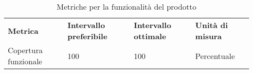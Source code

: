 \renewcommand{\arraystretch}{2.2}
\begin{longtable}{|C{4.5cm}|C{2.25cm}|C{2.25cm}|C{3cm}|}

	\caption{Metriche per la funzionalità del prodotto}\\
	\hline

	\textbf{Metrica} & \textbf{Intervallo preferibile}  & \textbf{Intervallo ottimale} & \textbf{Unità di misura}
	\tabularnewline
	\endfirsthead

	Copertura funzionale &  100 & 100 & Percentuale \\

\end{longtable}
